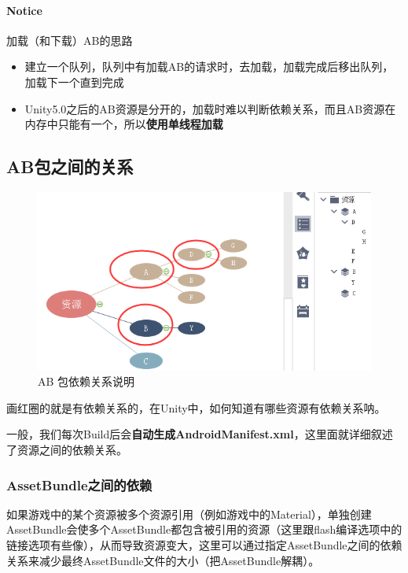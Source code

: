 \documentclass[UTF8,a4paper,12pt]{ctexbook}
\begin{document}
			
			\paragraph{Notice}加载（和下载）AB的思路
				\begin{itemize}
					\item 建立一个队列，队列中有加载AB的请求时，去加载，加载完成后移出队列，加载下一个直到完成
					\item Unity5.0之后的AB资源是分开的，加载时难以判断依赖关系，而且AB资源在内存中只能有一个，所以\textbf{使用单线程加载}
				\end{itemize}
				
				
		\subsection{AB包之间的关系}
			\begin{figure}[H]
				\centering
				\includegraphics[scale=0.64]{AbRelative}
				\caption{AB 包依赖关系说明}
			\end{figure}
			
			画红圈的就是有依赖关系的，在Unity中，如何知道有哪些资源有依赖关系呐。	
			
			一般，我们每次Build后会\textbf{自动生成AndroidManifest.xml}，这里面就详细叙述了资源之间的依赖关系。
			
			\subsubsection{AssetBundle之间的依赖}	
			
				如果游戏中的某个资源被多个资源引用（例如游戏中的Material），单独创建AssetBundle会使多个AssetBundle都包含被引用的资源（这里跟flash编译选项中的链接选项有些像），从而导致资源变大，这里可以通过指定AssetBundle之间的依赖关系来减少最终AssetBundle文件的大小（把AssetBundle解耦）。
								
\end{document}
